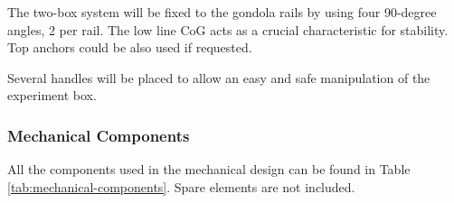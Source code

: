 The two-box system will be fixed to the gondola rails by using four 90-degree angles, 2 per rail. The low line CoG acts as a crucial characteristic for stability. Top anchors could be also used if requested. 


Several handles will be placed to allow an easy and safe manipulation of the experiment box. 


\subsubsection{Mechanical Components}

All the components used in the mechanical design can be found in Table \ref{tab:mechanical-components}. Spare elements are not included. 


\raggedbottom